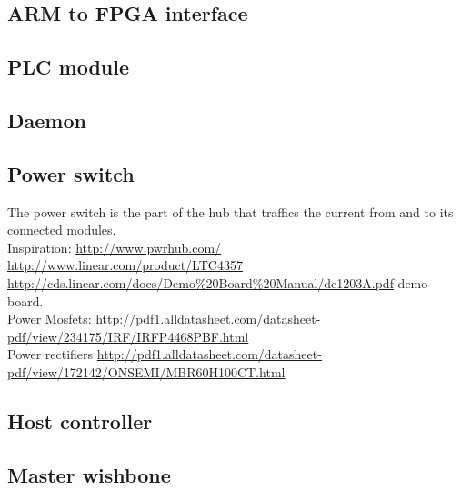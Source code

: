 \subsection{ARM to FPGA interface}



\subsection{PLC module}



\subsection{Daemon}



\subsection{Power switch}
The power switch is the part of the hub that traffics the current from and to its connected modules. 
\\ Inspiration: 
\url{http://www.pwrhub.com/}
\\ \url{http://www.linear.com/product/LTC4357}
\\ \url{http://cds.linear.com/docs/Demo\%20Board\%20Manual/dc1203A.pdf} demo board.
\\ Power Mosfets:
\url{http://pdf1.alldatasheet.com/datasheet-pdf/view/234175/IRF/IRFP4468PBF.html}
\\ Power rectifiers
\url{http://pdf1.alldatasheet.com/datasheet-pdf/view/172142/ONSEMI/MBR60H100CT.html}


\subsection{Host controller}



\subsection{Master wishbone}

